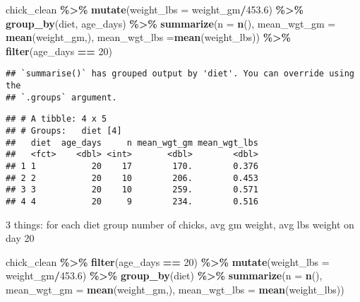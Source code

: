 \documentclass[
]{article}
\newenvironment{Shaded}{\begin{snugshade}}{\end{snugshade}}
\newcommand{\AttributeTok}[1]{\textcolor[rgb]{0.13,0.29,0.53}{#1}}
\newcommand{\DecValTok}[1]{\textcolor[rgb]{0.00,0.00,0.81}{#1}}
\newcommand{\FloatTok}[1]{\textcolor[rgb]{0.00,0.00,0.81}{#1}}
\newcommand{\FunctionTok}[1]{\textcolor[rgb]{0.13,0.29,0.53}{\textbf{#1}}}
\newcommand{\NormalTok}[1]{#1}
\newcommand{\SpecialCharTok}[1]{\textcolor[rgb]{0.81,0.36,0.00}{\textbf{#1}}}
\begin{document}
\begin{Shaded}
\begin{Highlighting}[]
\NormalTok{chick\_clean }\SpecialCharTok{\%\textgreater{}\%}
  \FunctionTok{mutate}\NormalTok{(}\AttributeTok{weight\_lbs =}\NormalTok{ weight\_gm}\SpecialCharTok{/}\FloatTok{453.6}\NormalTok{) }\SpecialCharTok{\%\textgreater{}\%}
  \FunctionTok{group\_by}\NormalTok{(diet, age\_days) }\SpecialCharTok{\%\textgreater{}\%}
  \FunctionTok{summarize}\NormalTok{(}\AttributeTok{n =} \FunctionTok{n}\NormalTok{(),}
            \AttributeTok{mean\_wgt\_gm =} \FunctionTok{mean}\NormalTok{(weight\_gm,),}
            \AttributeTok{mean\_wgt\_lbs =}\FunctionTok{mean}\NormalTok{(weight\_lbs)) }\SpecialCharTok{\%\textgreater{}\%}
  \FunctionTok{filter}\NormalTok{(age\_days }\SpecialCharTok{==} \DecValTok{20}\NormalTok{)}
\end{Highlighting}
\end{Shaded}

\begin{verbatim}
## `summarise()` has grouped output by 'diet'. You can override using the
## `.groups` argument.
\end{verbatim}

\begin{verbatim}
## # A tibble: 4 x 5
## # Groups:   diet [4]
##   diet  age_days     n mean_wgt_gm mean_wgt_lbs
##   <fct>    <dbl> <int>       <dbl>        <dbl>
## 1 1           20    17        170.        0.376
## 2 2           20    10        206.        0.453
## 3 3           20    10        259.        0.571
## 4 4           20     9        234.        0.516
\end{verbatim}

3 things: for each diet group number of chicks, avg gm weight, avg lbs
weight on day 20

\begin{Shaded}
\begin{Highlighting}[]
\NormalTok{chick\_clean }\SpecialCharTok{\%\textgreater{}\%}
  \FunctionTok{filter}\NormalTok{(age\_days }\SpecialCharTok{==} \DecValTok{20}\NormalTok{) }\SpecialCharTok{\%\textgreater{}\%}
  \FunctionTok{mutate}\NormalTok{(}\AttributeTok{weight\_lbs =}\NormalTok{ weight\_gm}\SpecialCharTok{/}\FloatTok{453.6}\NormalTok{) }\SpecialCharTok{\%\textgreater{}\%}
  \FunctionTok{group\_by}\NormalTok{(diet) }\SpecialCharTok{\%\textgreater{}\%}
  \FunctionTok{summarize}\NormalTok{(}\AttributeTok{n =} \FunctionTok{n}\NormalTok{(),}
            \AttributeTok{mean\_wgt\_gm =} \FunctionTok{mean}\NormalTok{(weight\_gm,),}
            \AttributeTok{mean\_wgt\_lbs =} \FunctionTok{mean}\NormalTok{(weight\_lbs))}
\end{Highlighting}
\end{Shaded}
\end{document}

